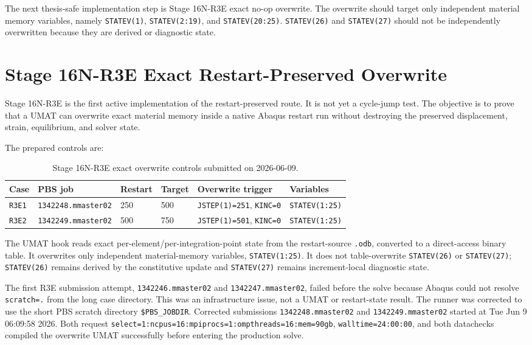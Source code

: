\documentclass[11pt,a4paper]{article}
\newcommand{\code}[1]{\texttt{#1}}
\begin{document}
The next thesis-safe implementation step is Stage 16N-R3E exact no-op overwrite. The overwrite should target only independent material memory variables, namely \code{STATEV(1)}, \code{STATEV(2:19)}, and \code{STATEV(20:25)}. \code{STATEV(26)} and \code{STATEV(27)} should not be independently overwritten because they are derived or diagnostic state.

\section{Stage 16N-R3E Exact Restart-Preserved Overwrite}

Stage 16N-R3E is the first active implementation of the restart-preserved route. It is not yet a cycle-jump test. The objective is to prove that a UMAT can overwrite exact material memory inside a native Abaqus restart run without destroying the preserved displacement, strain, equilibrium, and solver state.

The prepared controls are:

\begin{table}[H]
\centering
\caption{Stage 16N-R3E exact overwrite controls submitted on 2026-06-09.}
\begin{tabular}{llllll}
\toprule
Case & PBS job & Restart & Target & Overwrite trigger & Variables \\
\midrule
\code{R3E1} & \code{1342248.mmaster02} & 250 & 500 & \code{JSTEP(1)=251}, \code{KINC=0} & \code{STATEV(1:25)} \\
\code{R3E2} & \code{1342249.mmaster02} & 500 & 750 & \code{JSTEP(1)=501}, \code{KINC=0} & \code{STATEV(1:25)} \\
\bottomrule
\end{tabular}
\end{table}

The UMAT hook reads exact per-element/per-integration-point state from the restart-source \code{.odb}, converted to a direct-access binary table. It overwrites only independent material-memory variables, \code{STATEV(1:25)}. It does not table-overwrite \code{STATEV(26)} or \code{STATEV(27)}; \code{STATEV(26)} remains derived by the constitutive update and \code{STATEV(27)} remains increment-local diagnostic state.

The first R3E submission attempt, \code{1342246.mmaster02} and \code{1342247.mmaster02}, failed before the solve because Abaqus could not resolve \code{scratch=.} from the long case directory. This was an infrastructure issue, not a UMAT or restart-state result. The runner was corrected to use the short PBS scratch directory \code{\$PBS\_JOBDIR}. Corrected submissions \code{1342248.mmaster02} and \code{1342249.mmaster02} started at Tue Jun 9 06:09:58 2026. Both request \code{select=1:ncpus=16:mpiprocs=1:ompthreads=16:mem=90gb}, \code{walltime=24:00:00}, and both datachecks compiled the overwrite UMAT successfully before entering the production solve.
\end{document}

